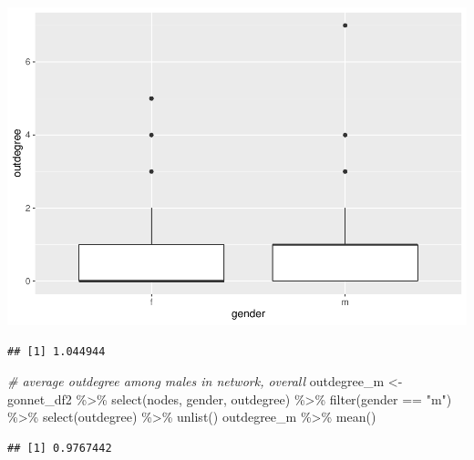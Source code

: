 \documentclass[12pt]{article}
\newenvironment{Shaded}{\begin{snugshade}}{\end{snugshade}}
\newcommand{\CommentTok}[1]{\textcolor[rgb]{0.56,0.35,0.01}{\textit{#1}}}
\newcommand{\FunctionTok}[1]{\textcolor[rgb]{0.00,0.00,0.00}{#1}}
\newcommand{\NormalTok}[1]{#1}
\newcommand{\OtherTok}[1]{\textcolor[rgb]{0.56,0.35,0.01}{#1}}
\newcommand{\SpecialCharTok}[1]{\textcolor[rgb]{0.00,0.00,0.00}{#1}}
\newcommand{\StringTok}[1]{\textcolor[rgb]{0.31,0.60,0.02}{#1}}
\begin{document}
\includegraphics{JStevenRaquel-paper_files/figure-latex/male-female-outdegree-1.pdf}

\begin{Shaded}
\end{Shaded}

\begin{verbatim}
## [1] 1.044944
\end{verbatim}

\begin{Shaded}
\begin{Highlighting}[]
\CommentTok{\# average outdegree among males in network, overall}
\NormalTok{outdegree\_m }\OtherTok{\textless{}{-}}\NormalTok{ gonnet\_df2 }\SpecialCharTok{\%\textgreater{}\%}
  \FunctionTok{select}\NormalTok{(nodes, gender, outdegree) }\SpecialCharTok{\%\textgreater{}\%}
  \FunctionTok{filter}\NormalTok{(gender }\SpecialCharTok{==} \StringTok{"m"}\NormalTok{) }\SpecialCharTok{\%\textgreater{}\%}
  \FunctionTok{select}\NormalTok{(outdegree) }\SpecialCharTok{\%\textgreater{}\%} 
  \FunctionTok{unlist}\NormalTok{()}
\NormalTok{outdegree\_m }\SpecialCharTok{\%\textgreater{}\%} \FunctionTok{mean}\NormalTok{()}
\end{Highlighting}
\end{Shaded}

\begin{verbatim}
## [1] 0.9767442
\end{verbatim}
\end{document}
